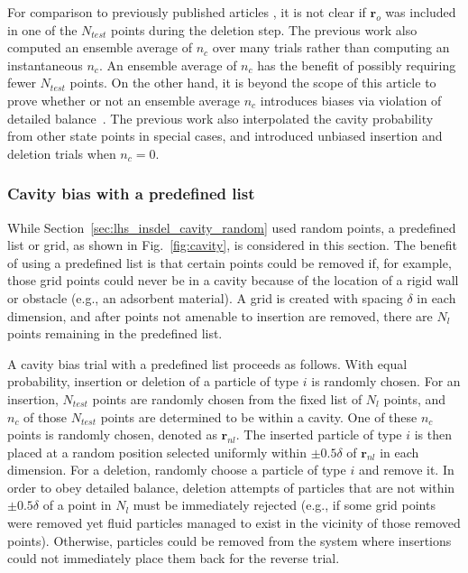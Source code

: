 \documentclass[
  9pt,
  bestpractices,
  pubversion,
]{livecoms}
\begin{document}
For comparison to previously published articles \cite{mezei_cavity-biased_1980, mezei_grand-canonical_1987, snurr_prediction_1993}, it is not clear if $\mathbf{r}_o$ was included in one of the $N_{test}$ points during the deletion step.
The previous work also computed an ensemble average of $n_c$ over many trials rather than computing an instantaneous $n_c$.
An ensemble average of $n_c$ has the benefit of possibly requiring fewer $N_{test}$ points.
On the other hand, it is beyond the scope of this article to prove whether or not an ensemble average $n_c$ introduces biases via violation of detailed balance~\cite{ikeda_generalization_2024}.
The previous work also interpolated the cavity probability from other state points in special cases, and introduced unbiased insertion and deletion trials when $n_c=0$.

\subsubsection{\label{sec:lhs_insdel_cavity_testpoint}Cavity bias with a predefined list}

While Section~\ref{sec:lhs_insdel_cavity_random} used random points, a predefined list or grid, as shown in Fig.~\ref{fig:cavity}, is considered in this section.
The benefit of using a predefined list is that certain points could be removed if, for example, those grid points could never be in a cavity because of the location of a rigid wall or obstacle (e.g., an adsorbent material).
A grid is created with spacing $\delta$ in each dimension, and after points not amenable to insertion are removed, there are $N_l$ points remaining in the predefined list.

A cavity bias trial with a predefined list proceeds as follows.
With equal probability, insertion or deletion of a particle of type $i$ is randomly chosen.
For an insertion, $N_{test}$ points are randomly chosen from the fixed list of $N_l$ points, and $n_c$ of those $N_{test}$ points are determined to be within a cavity.
One of these $n_c$ points is randomly chosen, denoted as $\mathbf{r}_{nl}$.
The inserted particle of type $i$ is then placed at a random position selected uniformly within $\pm 0.5\delta$ of $\mathbf{r}_{nl}$ in each dimension.
For a deletion, randomly choose a particle of type $i$ and remove it.
In order to obey detailed balance, deletion attempts of particles that are not within $\pm 0.5\delta$ of a point in $N_l$ must be immediately rejected (e.g., if some grid points were removed yet fluid particles managed to exist in the vicinity of those removed points).
Otherwise, particles could be removed from the system where insertions could not immediately place them back for the reverse trial.
\end{document}
